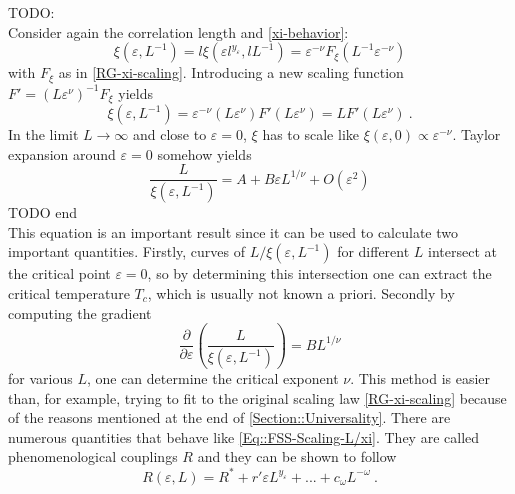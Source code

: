 	TODO: \\
	Consider again the correlation length and \autoref{xi-behavior}:
	\begin{equation}
		\xi(\varepsilon, L^{-1}) =	l \xi (\varepsilon l^{y_\varepsilon}, l L^{-1}) = \varepsilon^{-\nu} F_\xi (L^{-1} \varepsilon^{-\nu})
 	\end{equation} 
 	with $F_\xi$ as in \autoref{RG-xi-scaling}. Introducing a new scaling function $F' =	(L \varepsilon^\nu)^{-1} F_\xi$ yields
 	\begin{equation}
 		\xi(\varepsilon, L^{-1}) = \varepsilon^{-\nu} (L\varepsilon^\nu) F' (L \varepsilon^{\nu}) =	L	F'(L \varepsilon^\nu)~.	
 	\end{equation}
 	In the limit $L \rightarrow \infty$ and close to $\varepsilon =	0$, $\xi$ has to scale like $\xi(\varepsilon, 0) \propto \varepsilon^{-\nu}$. Taylor expansion around $\varepsilon =	0$ somehow yields \cite{goldenfeld2018lectures}
 	\begin{equation} \label{Eq::FSS-Scaling-L/xi}
 		\frac{L}{\xi(\varepsilon, L^{-1})} =	A + B \varepsilon L^{1/\nu} + O(\varepsilon^2)
 	\end{equation}
 	TODO end \\
 	
 	This equation is an important result since it can be used to calculate two important quantities. Firstly, curves of $L/\xi(\varepsilon, L^{-1})$ for different $L$ intersect at the critical point $\varepsilon = 0$, so by determining this intersection one can extract the critical temperature $T_c$, which is usually not known a priori. Secondly by computing the gradient
 	\begin{equation}
 		\frac{\partial}{\partial \varepsilon} \left(\frac{L}{\xi(\varepsilon, L^{-1})}\right) =	B L^{1/\nu}
 	\end{equation}
 	for various $L$, one can determine the critical exponent $\nu$. This method is easier than, for example, trying to fit to the original scaling law \autoref{RG-xi-scaling} because of the reasons mentioned at the end of \autoref{Section::Universality}. There are numerous quantities that behave like \autoref{Eq::FSS-Scaling-L/xi}. They are called phenomenological couplings $R$  and they can be shown \cite{hasenbusch2008critical} to follow
 		\begin{equation}
 		R(\varepsilon, L) =	R^* + r' \varepsilon L^{y_\varepsilon} + ... + c_\omega L^{-\omega}~. 
 	\end{equation}
